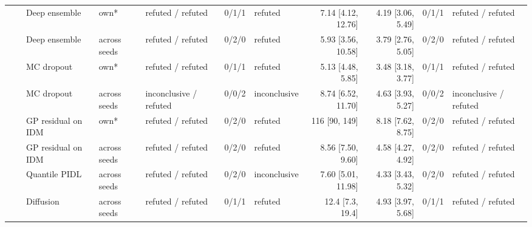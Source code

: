 \begin{longtable}{lllllrlrrrl}
 &  & Deep ensemble & own* & refuted / refuted & 0/1/1 & refuted & 7.14 [4.12, 12.76] & 4.19 [3.06, 5.49] & 0/1/1 & refuted / refuted \\
 &  & Deep ensemble & across seeds & refuted / refuted & 0/2/0 & refuted & 5.93 [3.56, 10.58] & 3.79 [2.76, 5.05] & 0/2/0 & refuted / refuted \\
 &  & MC dropout & own* & refuted / refuted & 0/1/1 & refuted & 5.13 [4.48, 5.85] & 3.48 [3.18, 3.77] & 0/1/1 & refuted / refuted \\
 &  & MC dropout & across seeds & inconclusive / refuted & 0/0/2 & inconclusive & 8.74 [6.52, 11.70] & 4.63 [3.93, 5.27] & 0/0/2 & inconclusive / refuted \\
 &  & GP residual on IDM & own* & refuted / refuted & 0/2/0 & refuted & 116 [90, 149] & 8.18 [7.62, 8.75] & 0/2/0 & refuted / refuted \\
 &  & GP residual on IDM & across seeds & refuted / refuted & 0/2/0 & refuted & 8.56 [7.50, 9.60] & 4.58 [4.27, 4.92] & 0/2/0 & refuted / refuted \\
 &  & Quantile PIDL & across seeds & refuted / refuted & 0/2/0 & inconclusive & 7.60 [5.01, 11.98] & 4.33 [3.43, 5.32] & 0/2/0 & refuted / refuted \\
 &  & Diffusion & across seeds & refuted / refuted & 0/1/1 & refuted & 12.4 [7.3, 19.4] & 4.93 [3.97, 5.68] & 0/1/1 & refuted / refuted \\
\end{longtable}
\endgroup
